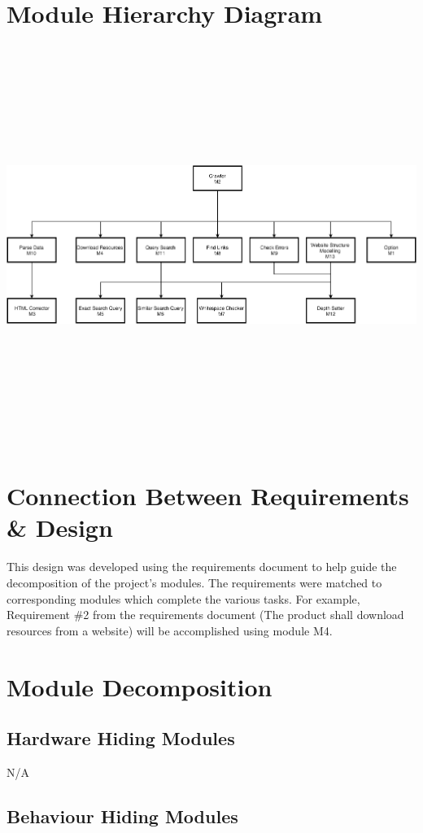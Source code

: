 \documentclass[titlepage]{article}
\begin{document}
\section{Module Hierarchy Diagram}
\includegraphics[width=19cm, height=13cm]{UsesDiagram.png}


\section{Connection Between Requirements \& Design}

This design was developed using the requirements document to help guide the decomposition of the project's modules. The requirements were matched to corresponding modules which complete the various tasks. For example, Requirement \#2 from the requirements document (The product shall download resources from a website) will be accomplished using module M4.


\section{Module Decomposition}
\subsection{Hardware Hiding Modules}
N/A
\subsection{Behaviour Hiding Modules}
\end{document}
